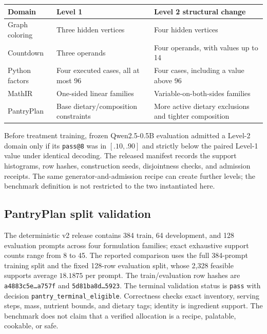 \documentclass{article}
\newcommand{\1}{\mathbf 1}
\theoremstyle{remark}
\theoremstyle{definition}
\theoremstyle{plain}
\begin{document}
\begin{center}
\small
\begin{tabularx}{.96\linewidth}{@{}lYY@{}}
\toprule
\textbf{Domain} & \textbf{Level 1} & \textbf{Level 2 structural change} \\
\midrule
Graph coloring & Three hidden vertices & Four hidden vertices \\
Countdown & Three operands & Four operands, with values up to 14 \\
Python factors & Four executed cases, all at most 96 & Four cases, including a value above 96 \\
MathIR & One-sided linear families & Variable-on-both-sides families \\
PantryPlan & Base dietary/composition constraints & More active dietary exclusions and tighter composition \\
\bottomrule
\end{tabularx}
\end{center}

Before treatment training, frozen Qwen2.5-0.5B evaluation admitted a Level-2
domain only if its \texttt{pass@8} was in $[.10,.90]$ and strictly below the
paired Level-1 value under identical decoding. The released manifest
 records the support
histograms, row hashes, construction seeds, disjointness checks, and admission
receipts. The same generator-and-admission recipe can create further levels;
the benchmark definition is not restricted to the two instantiated here.

\subsection{PantryPlan split validation}
\label{app:data-pantry}

The deterministic v2 release contains 384
train, 64 development, and 128 evaluation prompts across four formulation
families; exact exhaustive support counts range from 8 to 45. The reported
comparison uses the full 384-prompt training split and the
fixed 128-row evaluation split, whose 2,328 feasible supports average
$18.1875$ per prompt.
The train/evaluation row hashes are \texttt{a4883c5e\ldots a757f} and
\texttt{5d81ba8d\ldots5923}. The terminal validation status is \texttt{pass} with
decision \texttt{pantry\_terminal\_eligible}. Correctness checks exact inventory,
serving steps, mass, nutrient bounds, and dietary tags; identity is ingredient
support. The benchmark does not claim that a verified allocation is a recipe,
palatable, cookable, or safe.
\end{document}
